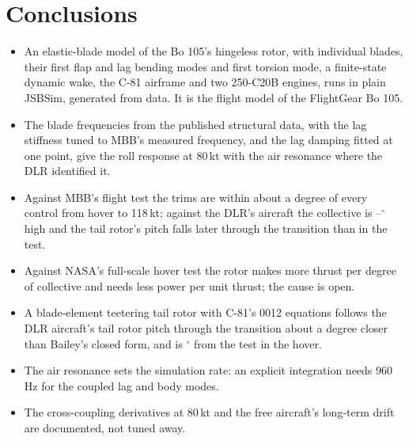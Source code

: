 \documentclass[10pt,a4paper,twocolumn]{article}
\begin{document}
\section{Conclusions}\label{sec:concl}
\begin{itemize}
\item An elastic-blade model of the Bo 105's hingeless rotor, with individual blades, their first flap and lag bending modes and first torsion mode, a
finite-state dynamic wake, the C-81 airframe and two 250-C20B engines, runs in plain JSBSim, generated from data. It is the flight model of the FlightGear Bo 105.
\item The blade frequencies from the published structural data, with the lag stiffness tuned to MBB's measured frequency, and the lag damping fitted at one
point, give the roll response at 80\,kt with the air resonance where the DLR identified it.
\item Against MBB's flight test the trims are within about a degree of every control from hover to 118\,kt; against the DLR's aircraft the collective is
\NDthzMin--\NDthzMax$^\circ$ high and the tail rotor's pitch falls later through the transition than in the test.
\item Against NASA's full-scale hover test the rotor makes more thrust per degree of collective and needs less power per unit thrust; the cause is open.
\item A blade-element teetering tail rotor with C-81's 0012 equations follows the DLR aircraft's tail rotor pitch through the transition
about a degree closer than Bailey's closed form, and is \NTrBeHover$^\circ$ from the test in the hover.
\item The air resonance sets the simulation rate: an explicit integration needs 960\,Hz for the coupled lag and body modes.
\item The cross-coupling derivatives at 80\,kt and the free aircraft's long-term drift are documented, not tuned away.
\end{itemize}
\end{document}
